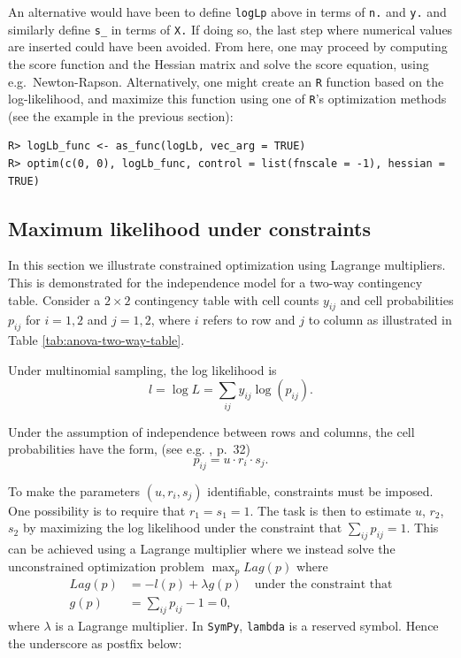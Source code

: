 An alternative would have been to define \texttt{logLp} above in terms of
\texttt{n.} and \texttt{y.} and similarly define \texttt{s\_} in terms of \texttt{X.} If doing so,
the last step where numerical values are inserted could have been
avoided. From here, one may proceed by computing the score function
and the Hessian matrix and solve the score equation, using
e.g.~Newton-Rapson. Alternatively, one might create an \texttt{R} function
based on the log-likelihood, and maximize this function using one of
\texttt{R}'s optimization methods (see the example in the previous section):

\begin{verbatim}
R> logLb_func <- as_func(logLb, vec_arg = TRUE)
R> optim(c(0, 0), logLb_func, control = list(fnscale = -1), hessian = TRUE)
\end{verbatim}

\hypertarget{maximum-likelihood-under-constraints}{%
\subsection{Maximum likelihood under constraints}\label{maximum-likelihood-under-constraints}}

In this section we illustrate constrained optimization using Lagrange multipliers.
This is demonstrated for the independence model for a two-way contingency table.
Consider a \(2 \times 2\) contingency table with cell
counts \(y_{ij}\) and cell probabilities \(p_{ij}\) for \(i=1,2\) and \(j=1,2\),
where \(i\) refers to row and \(j\) to column as
illustrated in Table \ref{tab:anova-two-way-table}.

Under multinomial sampling, the log likelihood is
\[
 l = \log L = \sum_{ij} y_{ij} \log(p_{ij}).
\]

Under the assumption of independence between rows and columns, the cell
probabilities have the form, (see e.g. \cite{hojsgaard}, p.~32)
\[
p_{ij}=u \cdot r_i \cdot s_j.
\]

To make the parameters \((u, r_i, s_j)\) identifiable, constraints
must be imposed. One possibility is to require that \(r_1=s_1=1\). The
task is then to estimate \(u\), \(r_2\), \(s_2\) by maximizing the log likelihood
under the constraint that \(\sum_{ij} p_{ij} = 1\). This can be
achieved using a Lagrange multiplier where we instead solve the
unconstrained optimization problem \(\max_p Lag(p)\) where
\begin{align}
  Lag(p) &= -l(p) + \lambda g(p) \quad \text{under the constraint that} \\
  g(p) &= \sum_{ij} p_{ij} - 1 = 0 ,
\end{align}
where \(\lambda\) is a Lagrange multiplier.
In \texttt{SymPy}, \texttt{lambda} is a reserved symbol. Hence the underscore as postfix below:

